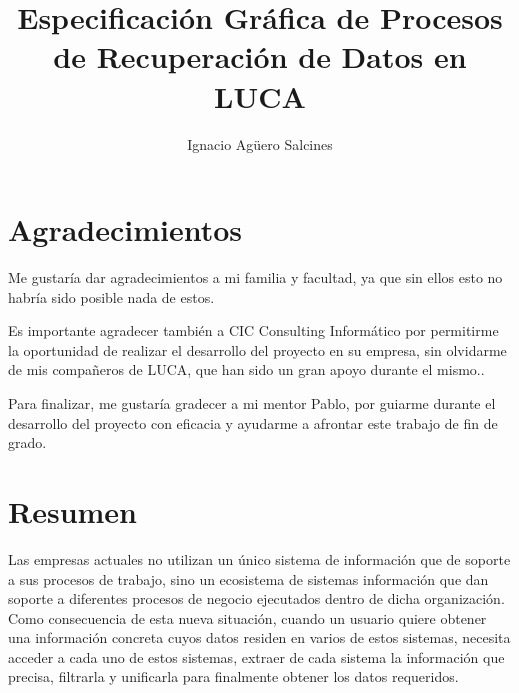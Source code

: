 \documentclass[a4paper,12pt]{book}
\author{Ignacio Agüero Salcines}
\title{Especificación Gráfica de Procesos de Recuperación de Datos en LUCA}
\begin{document}
	
	
	\pagestyle{empty}
	\dominitoc%
	\tableofcontents
	\cleardoublepage
	
	\pagestyle{plain}
	
	\listoffigures
	\listoftables
	\thispagestyle{empty}
	\cleardoublepage
	
	\chapter*{Agradecimientos}
	Me gustaría dar agradecimientos a mi familia y facultad, ya que sin ellos esto no habría sido posible nada de estos.
	
	\vspace{5mm}
	
	\noindent Es importante agradecer también a CIC Consulting Informático por permitirme la oportunidad de realizar el desarrollo del proyecto en su empresa, sin olvidarme de mis compañeros de LUCA, que han sido un gran apoyo durante el mismo..
	
	\vspace{5mm}
	
	\noindent Para finalizar, me gustaría gradecer a mi mentor Pablo, por guiarme durante el desarrollo del proyecto con eficacia y ayudarme a afrontar este trabajo de fin de grado.
	\cleardoublepage
	
	\clearpage
	
	\chapter*{Resumen}
	Las empresas actuales no utilizan un único sistema de información que de soporte a sus procesos de trabajo, sino un  ecosistema de sistemas información que dan soporte a diferentes procesos de negocio ejecutados dentro de dicha organización. Como consecuencia de esta nueva situación, cuando un usuario	quiere obtener una información concreta cuyos datos residen en varios de estos
	sistemas, necesita acceder a cada uno de estos sistemas, extraer de cada sistema la información que precisa, filtrarla y unificarla para finalmente	obtener los datos requeridos.
	
	\vspace{5mm}
	
\end{document}
